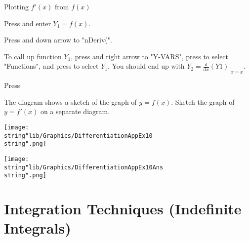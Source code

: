 \documentclass[11pt,a4paper]{book}
\begin{document}
\begin{GC}{Plotting $f'\left(x\right)$ from $f\left(x\right)$}

\begin{steps}
\item Press \tcbox[box align=base,nobeforeafter,colback=white, colframe=black,size=small]{\textbf{\textcolor{black}{Y=}}} and enter $Y_{1}=f\left(x\right)$.
\item Press \tcbox[box align=base,nobeforeafter,colback=black, colframe=black,size=small]{\textbf{\textcolor{white}{math}}} and down arrow to "nDeriv(".
\item To call up function $Y_{1}$, press \tcbox[box align=base,nobeforeafter,colback=black, colframe=black,size=small]{\textbf{\textcolor{white}{vars}}} and right arrow to  "Y-VARS", press \tcbox[box align=base,nobeforeafter,colback=white, colframe=black,size=small]{\textbf{\textcolor{black}{$1$}}} to select "Functions", and press \tcbox[box align=base,nobeforeafter,colback=white, colframe=black,size=small]{\textbf{\textcolor{black}{$1$}}} to select $Y_{1}$. You should end up with $Y_{2}=\left.\frac{\mathrm{d}}{\mathrm{d}x}\left(Y1\right)\right|_{x=x}$.
\item Press \tcbox[box align=base,nobeforeafter,colback=white, colframe=black,size=small]{\textbf{\textcolor{black}{graph}}}
\end{steps}

\end{GC}

\newpage{}

\begin{example}


The diagram shows a sketch of the graph of $y=f\left(x\right)$. Sketch
the graph of $y=f'\left(x\right)$ on a separate diagram.
\begin{center}
\texttt{[image: \\string"lib/Graphics/DifferentiationAppEx10\\string".png]}
\par\end{center}

\Solution

\begin{center}
\texttt{[image: \\string"lib/Graphics/DifferentiationAppEx10Ans\\string".png]}
\par\end{center}

\end{example}

\chapter{Integration Techniques (Indefinite Integrals)}
\end{document}
